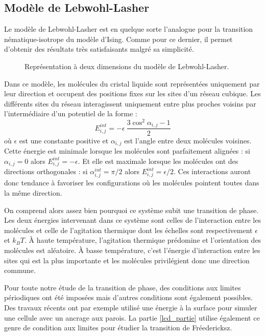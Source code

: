 \documentclass[11pt]{article}
\numberwithin{equation}{section}
\begin{document}
\subsection{Modèle de Lebwohl-Lasher}
\label{lebwohlpart}
Le modèle de Lebwohl-Lasher \cite{model} est en quelque sorte l'analogue pour la transition nématique-isotrope du modèle d'Ising. Comme pour ce dernier, il permet d'obtenir des résultats très satisfaisants malgré sa simplicité.\medskip

\begin{figure}[h!]
    \center
    
    \caption{Représentation à deux dimensions du modèle de Lebwohl-Lasher.}
    \label{lebwohl}
\end{figure}


Dans ce modèle, les molécules du cristal liquide sont représentées uniquement par leur direction et occupent des positions fixes sur les sites d'un réseau cubique.
Les différents sites du réseau interagissent uniquement entre plus proches voisins par l'intermédiaire d'un potentiel de la forme :
\begin{equation}
E_{i,j}^{int} = - \epsilon\ \frac{3\cos^2\alpha_{i,j}-1}{2}
\label{interact}
\end{equation}
où $\epsilon$ est une constante positive et $\alpha_{i,j}$ est l'angle entre deux molécules voisines. 
Cette énergie est minimale lorsque les molécules sont parfaitement alignées : si $\alpha_{i,j} = 0$ alors $E_{i,j}^{int} = - \epsilon$. Et elle est maximale lorsque les molécules ont des directions orthogonales : si $\alpha_{i,j}^{int} = \pi/2$ alors $E_{i,j}^{int} = \epsilon/2$.
Ces interactions auront donc tendance à favoriser les configurations où les molécules pointent toutes dans la même direction.\medskip

On comprend alors assez bien pourquoi ce système subit une transition de phase. Les deux énergies intervenant dans ce système sont celles de l'interaction entre les molécules et celle de l'agitation thermique dont les échelles sont respectivement $\epsilon$ et $k_B T$.
À haute température, l'agitation thermique prédomine et l'orientation des molécules est aléatoire. À basse température, c'est l'énergie d'interaction entre les sites qui est la plus importante et les molécules privilégient donc une direction commune.\medskip

Pour toute notre étude de la transition de phase, des conditions aux limites périodiques ont été imposées mais d'autres conditions sont également possibles. Des travaux récents \cite{confined} ont par exemple utilisé une énergie à la surface  pour simuler une cellule avec un ancrage aux parois. La partie \ref{lcd_partie} utilise également ce genre de condition aux limites pour étudier la transition de Fréedericksz.
\end{document}
